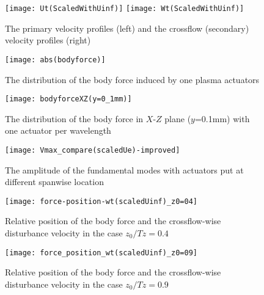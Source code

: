 \documentclass{AIAA}
\begin{document}
\begin{figure}
\centering
  \texttt{[image: Ut(ScaledWithUinf)]} \texttt{[image: Wt(ScaledWithUinf)]}
  \caption{The primary velocity profiles (left) and the crossflow (secondary) velocity profiles (right)}%
  \label{f:BLvelocityprofile}
\end{figure}

\begin{figure}
\centering
  \texttt{[image: abs(bodyforce)]}
  \caption{The distribution of the body force induced by one plasma actuators}%
  \label{f:forceshape}
\end{figure}

\begin{figure}
\centering
  \texttt{[image: bodyforceXZ(y=0\_1mm)]}
  \caption{The distribution of the body force in $X$-$Z$ plane ($y$=0.1mm) with one actuator per wavelength}%
  \label{f:force_XZ_1perwavelength}
\end{figure}

\begin{figure}
\centering
  \texttt{[image: Vmax\_compare(scaledUe)-improved]}
  \caption{The amplitude of the fundamental modes with actuators put at different spanwise location}%
  \label{f:bestworst}
\end{figure}

\begin{figure}
\centering
  \texttt{[image: force-position-wt(scaledUinf)\_z0=04]}
  \caption{Relative position of the body force and the crossflow-wise disturbance velocity in the case $z_0/Tz=0.4$}%
  \label{f:thebest}
\end{figure}

\begin{figure}
\centering
  \texttt{[image: force\_position\_wt(scaledUinf)\_z0=09]}
  \caption{Relative position of the body force and the crossflow-wise disturbance velocity in the case $z_0/Tz=0.9$}%
  \label{f:theworst}
\end{figure}
\end{document}
